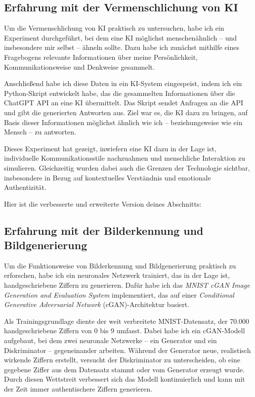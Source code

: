 \documentclass[a4paper,12pt]{article}
\begin{document}
\subsection{Erfahrung mit der Vermenschlichung von KI}

Um die Vermenschlichung von KI praktisch zu untersuchen, habe ich ein Experiment durchgeführt, bei dem eine KI möglichst menschenähnlich – und insbesondere mir selbst – ähneln sollte. Dazu habe ich zunächst mithilfe eines Fragebogens relevante Informationen über meine Persönlichkeit, Kommunikationsweise und Denkweise gesammelt.

Anschließend habe ich diese Daten in ein KI-System eingespeist, indem ich ein Python-Skript entwickelt habe, das die gesammelten Informationen über die ChatGPT API an eine KI übermittelt. Das Skript sendet Anfragen an die API und gibt die generierten Antworten aus. Ziel war es, die KI dazu zu bringen, auf Basis dieser Informationen möglichst ähnlich wie ich – beziehungsweise wie ein Mensch – zu antworten.

Dieses Experiment hat gezeigt, inwiefern eine KI dazu in der Lage ist, individuelle Kommunikationsstile nachzuahmen und menschliche Interaktion zu simulieren. Gleichzeitig wurden dabei auch die Grenzen der Technologie sichtbar, insbesondere in Bezug auf kontextuelles Verständnis und emotionale Authentizität.

Hier ist die verbesserte und erweiterte Version deines Abschnitts:

\subsection{Erfahrung mit der Bilderkennung und Bildgenerierung}

Um die Funktionsweise von Bilderkennung und Bildgenerierung praktisch zu erforschen, habe ich ein neuronales Netzwerk trainiert, das in der Lage ist, handgeschriebene Ziffern zu generieren. Dafür habe ich das \textit{MNIST cGAN Image Generation and Evaluation System} implementiert, das auf einer \textit{Conditional Generative Adversarial Network} (cGAN)-Architektur basiert.

Als Trainingsgrundlage diente der weit verbreitete MNIST-Datensatz, der 70.000 handgeschriebene Ziffern von 0 bis 9 umfasst. Dabei habe ich ein cGAN-Modell aufgebaut, bei dem zwei neuronale Netzwerke – ein Generator und ein Diskriminator – gegeneinander arbeiten. Während der Generator neue, realistisch wirkende Ziffern erstellt, versucht der Diskriminator zu unterscheiden, ob eine gegebene Ziffer aus dem Datensatz stammt oder vom Generator erzeugt wurde. Durch diesen Wettstreit verbessert sich das Modell kontinuierlich und kann mit der Zeit immer authentischere Ziffern generieren.
\end{document}
